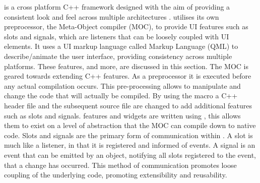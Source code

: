  is a cross platform C++ framework designed with the aim of providing a consistent look and feel across multiple architectures \cite{qt_about}.  utilises its own preprocessor, the Meta-Object compiler (MOC), to provide UI features such as slots and signals, which are listeners that can be loosely coupled with UI elements. It uses a UI markup language called  Markup Language (QML) to describe/animate the user interface, providing consistency across multiple platforms. These features, and more, are discussed in this section.
  The MOC is geared towards extending C++ features. As a preprocessor it is executed before any actual compilation occurs\cite{qt_moc}. This pre-processing allows  to manipulate and change the code that will actually be compiled. By using the  macro a C++ header file and the subsequent source file are changed to add additional features such as slots and signals.  features and widgets are written using , this allows them to exist on a level of abstraction that the MOC can compile down to native code.
  Slots and signals are the primary form of communication within \cite{qt_slotsnsignals}. A slot is much like a listener, in that it is registered and informed of events. A signal is an event that can be emitted by an object, notifying all slots registered to the event, that a change has occurred. This method of communication promotes loose coupling of the underlying code, promoting extensibility and reusability.


